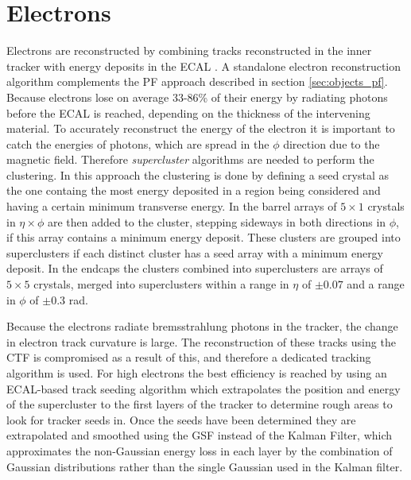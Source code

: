 \section{Electrons}
\label{sec:objects_ele}
Electrons are reconstructed by combining tracks reconstructed
in the inner tracker with energy deposits in the \ac{ECAL} \cite{cms-elereco-run1}.
A standalone electron reconstruction algorithm \cite{cms-elereco-run1} complements the \ac{PF} approach
described in section \ref{sec:objects_pf}. Because electrons lose on average 33-86\% of
their energy by radiating photons before the \ac{ECAL} is reached, depending on the thickness of
the intervening material. To accurately reconstruct the energy of the electron it is
important to catch the energies of photons, which are spread in the $\phi$ direction
due to the magnetic field. Therefore \textit{supercluster} algorithms are needed to perform
the clustering. In this approach the clustering
is done by defining a seed crystal as the one containg the most energy deposited
in a region being considered and having a certain minimum transverse energy.
In the barrel arrays of $5\times 1$ crystals in $\eta \times \phi$ are then added
to the cluster, stepping sideways in both directions in $\phi$, if this
array contains a minimum energy deposit. These clusters are grouped into 
superclusters if each distinct cluster has a seed array with a minimum energy deposit.
In the endcaps the clusters combined into superclusters are arrays of $5\times 5$ crystals,
merged into superclusters within a range in $\eta$ of $\pm 0.07$ and a range in $\phi$ of $\pm 0.3$ rad.

Because the electrons radiate bremsstrahlung photons in the tracker, the
change in electron track curvature is large. The reconstruction of these
tracks using the \ac{CTF} is compromised as a result of this, and 
therefore a dedicated tracking algorithm is used. For high \pT electrons
the best efficiency is reached by using an \ac{ECAL}-based track seeding
algorithm which extrapolates the position and energy of the supercluster
to the first layers of the tracker to determine rough areas to look for
tracker seeds in. Once the seeds have been determined they are extrapolated
and smoothed using the \ac{GSF} \cite{trk-gsf} instead of the Kalman Filter, which 
approximates the non-Gaussian energy loss in each layer by the combination of 
Gaussian distributions rather than the single Gaussian used in the Kalman filter.


